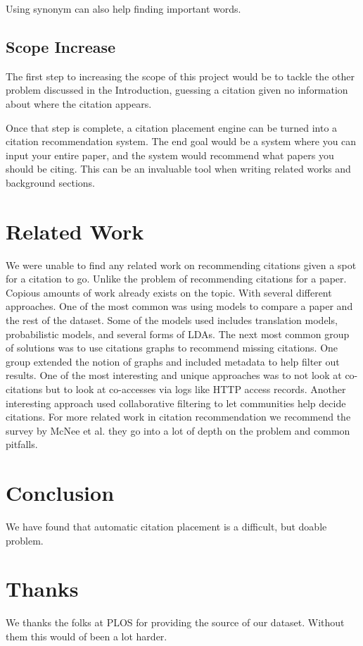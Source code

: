 \documentclass[10pt, conference, compsocconf]{IEEEtran}
\begin{document}
Using synonym can also help finding important words.

\subsection{Scope Increase}
The first step to increasing the scope of this project would be to tackle the other problem discussed in the Introduction,
guessing a citation given no information about where the citation appears.

Once that step is complete, a citation placement engine can be turned into a citation recommendation system.
The end goal would be a system where you can input your entire paper, and the system would recommend what papers
you should be citing. This can be an invaluable tool when writing related works and background sections.

\section{Related Work}\label{sec:related}
We were unable to find any related work on recommending citations given a spot for a citation to go. Unlike the problem of recommending citations for a paper. Copious amounts of work already exists on the topic. With several different approaches. One of the most common was using models to compare a paper and the rest of the dataset. Some of the models used includes translation models, probabilistic models, and several forms of LDAs.\cite{cite1, cite2, cite3} The next most common group of solutions was to use citations graphs to recommend missing citations.\cite{cite6} One group extended the notion of graphs and included metadata to help filter out results.\cite{cite4} One of the most 
interesting and unique approaches was to not look at co-citations but to look at co-accesses via logs like HTTP access records.\cite{cite7}
Another interesting approach used collaborative filtering to let communities help decide citations.\cite{cite8} For more related work in
citation recommendation we recommend the survey by McNee et al. they go into a lot of depth on the problem and common pitfalls.\cite{cite5}

\section{Conclusion}\label{sec:conclusion}
We have found that automatic citation placement is a difficult, but doable problem.

\section{Thanks}
We thanks the folks at PLOS for providing the source of our dataset. Without them this would of been a lot harder.



\end{document}
